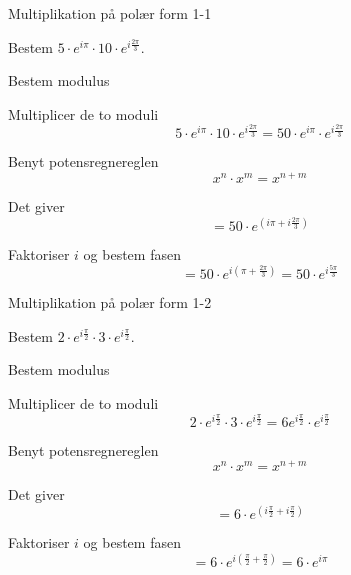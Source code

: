 \documentclass{article}
\begin{document}
\tableofcontents
\newpage

\begin{exercise}{Multiplikation på polær form 1-1}

Bestem $5 \cdot e^{i \pi} \cdot 10 \cdot e^{i \frac{2 \pi}{3}}$.



\hint 

Bestem modulus


\hint

Multiplicer de to moduli 
\[
5 \cdot e^{i \pi} \cdot 10 \cdot e^{i \frac{2 \pi}{3}} = 50 \cdot e^{i \pi} \cdot e^{i \frac{2 \pi}{3}}
\]

\hint 

Benyt potensregnereglen
\[
x^n \cdot x^m = x^{n+m}
\]

\hint

Det giver
\[
=50 \cdot e^{(i \pi +i \frac{2 \pi}{3})} 
\]

\hint

Faktoriser $i$ og bestem fasen
\[
= 50 \cdot e^{i( \pi +\frac{2 \pi}{3})}  = 50 \cdot e^{i \frac{5\pi }{3}}
\]


\end{exercise}

\newpage

\begin{exercise}{Multiplikation på polær form 1-2}
	
	Bestem $2 \cdot e^{i \frac{\pi}{2}} \cdot 3 \cdot e^{i \frac{\pi}{2}}$.
	
	
	
	\hint 
	
	Bestem modulus
	
	
	\hint
	
	Multiplicer de to moduli 
	\[
	2 \cdot e^{i \frac{\pi}{2}} \cdot 3 \cdot e^{i \frac{\pi}{2}} = 6 e^{i \frac{\pi}{2}} \cdot e^{i \frac{\pi}{2}}
	\]
	
	\hint 
	
	Benyt potensregnereglen
	\[
	x^n \cdot x^m = x^{n+m}
	\]
	
	\hint
	
	Det giver
	\[
	= 6 \cdot e^{(i \frac{\pi}{2}+ i \frac{\pi}{2})}
	\]
	
	\hint
	
	Faktoriser $i$ og bestem fasen
	\[
	= 6 \cdot e^{i( \frac{\pi}{2}+\frac{\pi}{2})} = 6 \cdot e^{i \pi}
	\]
	
	
\end{exercise}
\end{document}
